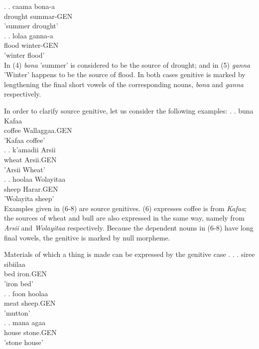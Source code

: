 \documentclass[11pt,a4paper]{article}
\begin{document}
	\ex.
	\ag.
	caama bona-a\\
	drought summar-GEN\\
	'summer drought'\\
	
	\ex.
	\ag.
	lolaa ganna-a\\
	flood winter-GEN\\
	'winter flood'\\
	
	In (4) \emph{bona} 'summer' is considered to be the source of drought; and in (5) \emph{ganna} 'Winter' happens to be the source of flood. In both cases genitive is marked by lengthening the final short vowels of the corresponding nouns, \emph{bona} and \emph{ganna} respectively. 
	
	In order to clarify source genitive, let us consider the following examples:
	\ex.
	\ag.
	buna Kafaa\\
	coffee Wallaggaa.GEN\\
	'Kafaa coffee'\\
	
	\ex.
	\ag.
	k'amadii Arsii\\
	wheat Arsii.GEN\\
	'Arsii Wheat'\\
	
	\ex.
	\ag.
	hoolaa Wolayitaa\\
	sheep Harar.GEN\\
	'Wolayita sheep'\\
	
	Examples given in (6-8) are source genitives. (6) expresses coffee is from \emph{Kafaa}; the sources of wheat and bull are also expressed in the same way, namely from \emph{Arsii} and \emph{Wolayitaa} respectively. Because the dependent nouns in (6-8) have long final vowels, the genitive is marked by null morpheme. 
	
	Materials of which a thing is made can be expressed by the genitive case \cite[69]{greenlee1950genitive}.
	\ex.
	\ag.
	siree sibiilaa\\
	bed iron.GEN\\
	'iron bed'\\
	
	\ex.
	\ag.
	foon hoolaa\\
	meat sheep.GEN\\
	'mutton'\\
	
	\ex.
	\ag.
	mana agaa\\
	house stone.GEN\\
	'stone house'\\
	
\end{document}
